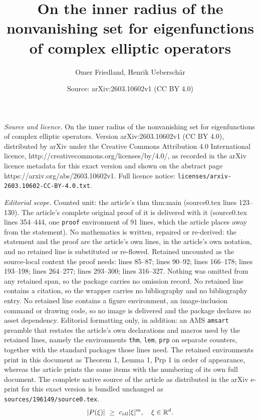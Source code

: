 \documentclass[10pt,a4paper]{amsart}
\title{On the inner radius of the nonvanishing set for eigenfunctions of complex elliptic operators}
\author{Omer Friedland, Henrik Uebersch\"ar}
\date{Source: arXiv:2603.10602v1 (CC BY 4.0)}
\newcommand{\R}{\mathbb{R}}
\begin{document}
\maketitle

\noindent\emph{Source and licence.} On the inner radius of the nonvanishing set for eigenfunctions of complex elliptic operators. Version arXiv:2603.10602v1 (CC BY 4.0), distributed by arXiv under the Creative Commons Attribution 4.0 International licence, http://creativecommons.org/licenses/by/4.0/, as recorded in the arXiv licence metadata for this exact version and shown on the abstract page https://arxiv.org/abs/2603.10602v1. Full licence notice: \texttt{licenses/arxiv-2603.10602-CC-BY-4.0.txt}.\par\smallskip

\noindent\textit{Editorial scope.} Counted unit: the article's thm thm:main (source0.tex lines 123--130). The article's complete original proof of it is delivered with it (source0.tex lines 354--444, one \texttt{proof} environment of 91 lines, which the article places away from the statement). No mathematics is written, repaired or re-derived: the statement and the proof are the article's own lines, in the article's own notation, and no retained line is substituted or re-flowed.  Retained uncounted as the source-local context the proof needs: lines 85--87; lines 90--92; lines 166--178; lines 193--198; lines 264--277; lines 293--300; lines 316--327.  Nothing was omitted from any retained span, so the package carries no omission record.  No retained line contains a citation, so the wrapper carries no bibliography and no bibliography entry.  No retained line contains a figure environment, an image-inclusion command or drawing code, so no image is delivered and the package declares no asset dependency.  Editorial formatting only, in addition: an AMS \texttt{amsart} preamble that restates the article's own declarations and macros used by the retained lines, namely the environments \texttt{thm}, \texttt{lem}, \texttt{prp} on separate counters, together with the standard packages those lines need.  The retained environments print in this document as Theorem 1, Lemma 1, Prp 1 in order of appearance, whereas the article prints the same items with the numbering of its own full document.  The complete native source of the article as distributed in the arXiv e-print for this exact version is bundled unchanged as \texttt{sources/196149/source0.tex}.
\begin{equation}\label{eq:ellipticity}
|P(\xi)|\ \ge\ c_{\rm ell} |\xi|^m,\quad \xi\in\R^d.
\end{equation}
\end{document}
